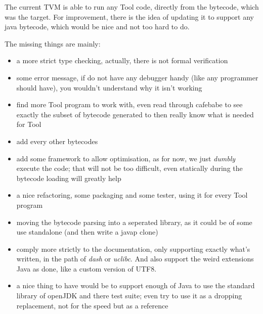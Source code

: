 %

The current TVM is able to run any Tool code, directly from the bytecode, which
was the target. For improvement, there is the idea of updating it to support any
java bytecode, which would be nice and not too hard to do.

The missing things are mainly:
\begin{itemize}
	\item a more strict type checking, actually, there is not formal
		verification

	\item some error message, if do not have any debugger handy (like any
		programmer should have), you wouldn't understand why it isn't
		working

	\item find more Tool program to work with, even read through cafebabe to
		see exactly the subset of bytecode generated to then really know
		what is needed for Tool

	\item add every other bytecodes

	\item add some framework to allow optimisation, as for now, we just
		\emph{dumbly} execute the code; that will not be too difficult,
		even statically during the bytecode loading will greatly help

	\item a nice refactoring, some packaging and some tester, using it for
		every Tool program

	\item moving the bytecode parsing into a seperated library, as it could
		be of some use standalone (and then write a javap clone)

	\item comply more strictly to the documentation, only supporting exactly
		what's written, in the path of \emph{dash} or \emph{uclibc}. And
		also support the weird extensions Java as done, like a custom
		version of UTF8.

	\item a nice thing to have would be to support enough of Java to use the
		standard library of openJDK and there test suite; even try to
		use it as a dropping replacement, not for the speed but as a
		reference
\end{itemize}
